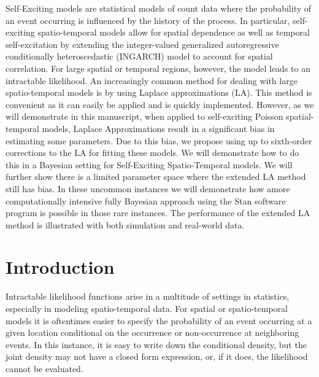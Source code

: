 \documentclass[11pt]{isuthesis}
\begin{document}
	Self-Exciting models are statistical models of count data where the probability of an event occurring is influenced by the history of the process.  In particular, self-exciting spatio-temporal models allow for spatial dependence as well as temporal self-excitation by extending the integer-valued generalized autoregressive conditionally heteroscedastic (INGARCH) model to account for spatial correlation.  For large spatial or temporal regions, however, the model leads to an intractable likelihood.  An increasingly common method for dealing with large spatio-temporal models is by using Laplace approximations (LA).  This method is convenient as it can easily be applied and is quickly implemented.  However, as we will demonstrate in this manuscript, when applied to self-exciting Poisson spatial-temporal models, Laplace Approximations result in a significant bias in estimating some parameters.  Due to this bias, we propose using up to sixth-order corrections to the LA for fitting these models.  We will demonstrate how to do this in a Bayesian setting for Self-Exciting Spatio-Temporal models.  We will further show there is a limited parameter space where the extended LA method still has bias.  In these uncommon instances we will demonstrate how amore computationally intensive fully Bayesian approach using the Stan software program is possible in those rare instances.  The performance of the extended LA method is illustrated with both simulation and real-world data.
	\section{Introduction} 
	
	Intractable likelihood functions arise in a multitude of settings in statistics, especially in modeling spatio-temporal data.  For spatial or spatio-temporal models it is oftentimes easier to specify the probability of an event occurring at a given location conditional on the occurrence or non-occurrence at neighboring events.  In this instance, it is easy to write down the conditional density, but the joint density may not have a closed form expression, or, if it does, the likelihood cannot be evaluated.  
	
\end{document}
